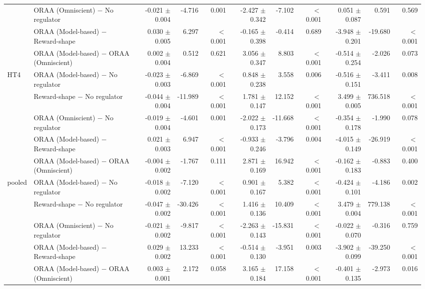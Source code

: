\begin{tabular}{llrrrrrrrrr}
 & ORAA (Omniscient) $-$ No regulator & -0.021 $\pm$ 0.004 & -4.716 & 0.001 & -2.427 $\pm$ 0.342 & -7.102 & $<$0.001 & 0.051 $\pm$ 0.087 & 0.591 & 0.569 \\
 & ORAA (Model-based) $-$ Reward-shape & 0.030 $\pm$ 0.005 & 6.297 & $<$0.001 & -0.165 $\pm$ 0.398 & -0.414 & 0.689 & -3.948 $\pm$ 0.201 & -19.680 & $<$0.001 \\
 & ORAA (Model-based) $-$ ORAA (Omniscient) & 0.002 $\pm$ 0.004 & 0.512 & 0.621 & 3.056 $\pm$ 0.347 & 8.803 & $<$0.001 & -0.514 $\pm$ 0.254 & -2.026 & 0.073 \\
\addlinespace
HT4 & ORAA (Model-based) $-$ No regulator & -0.023 $\pm$ 0.003 & -6.869 & $<$0.001 & 0.848 $\pm$ 0.238 & 3.558 & 0.006 & -0.516 $\pm$ 0.151 & -3.411 & 0.008 \\
 & Reward-shape $-$ No regulator & -0.044 $\pm$ 0.004 & -11.989 & $<$0.001 & 1.781 $\pm$ 0.147 & 12.152 & $<$0.001 & 3.499 $\pm$ 0.005 & 736.518 & $<$0.001 \\
 & ORAA (Omniscient) $-$ No regulator & -0.019 $\pm$ 0.004 & -4.601 & 0.001 & -2.022 $\pm$ 0.173 & -11.668 & $<$0.001 & -0.354 $\pm$ 0.178 & -1.990 & 0.078 \\
 & ORAA (Model-based) $-$ Reward-shape & 0.021 $\pm$ 0.003 & 6.947 & $<$0.001 & -0.933 $\pm$ 0.246 & -3.796 & 0.004 & -4.015 $\pm$ 0.149 & -26.919 & $<$0.001 \\
 & ORAA (Model-based) $-$ ORAA (Omniscient) & -0.004 $\pm$ 0.002 & -1.767 & 0.111 & 2.871 $\pm$ 0.169 & 16.942 & $<$0.001 & -0.162 $\pm$ 0.183 & -0.883 & 0.400 \\
\addlinespace
pooled & ORAA (Model-based) $-$ No regulator & -0.018 $\pm$ 0.002 & -7.120 & $<$0.001 & 0.901 $\pm$ 0.167 & 5.382 & $<$0.001 & -0.424 $\pm$ 0.101 & -4.186 & 0.002 \\
 & Reward-shape $-$ No regulator & -0.047 $\pm$ 0.002 & -30.426 & $<$0.001 & 1.416 $\pm$ 0.136 & 10.409 & $<$0.001 & 3.479 $\pm$ 0.004 & 779.138 & $<$0.001 \\
 & ORAA (Omniscient) $-$ No regulator & -0.021 $\pm$ 0.002 & -9.817 & $<$0.001 & -2.263 $\pm$ 0.143 & -15.831 & $<$0.001 & -0.022 $\pm$ 0.070 & -0.316 & 0.759 \\
 & ORAA (Model-based) $-$ Reward-shape & 0.029 $\pm$ 0.002 & 13.233 & $<$0.001 & -0.514 $\pm$ 0.130 & -3.951 & 0.003 & -3.902 $\pm$ 0.099 & -39.250 & $<$0.001 \\
 & ORAA (Model-based) $-$ ORAA (Omniscient) & 0.003 $\pm$ 0.001 & 2.172 & 0.058 & 3.165 $\pm$ 0.184 & 17.158 & $<$0.001 & -0.401 $\pm$ 0.135 & -2.973 & 0.016 \\
\bottomrule
\end{tabular}
